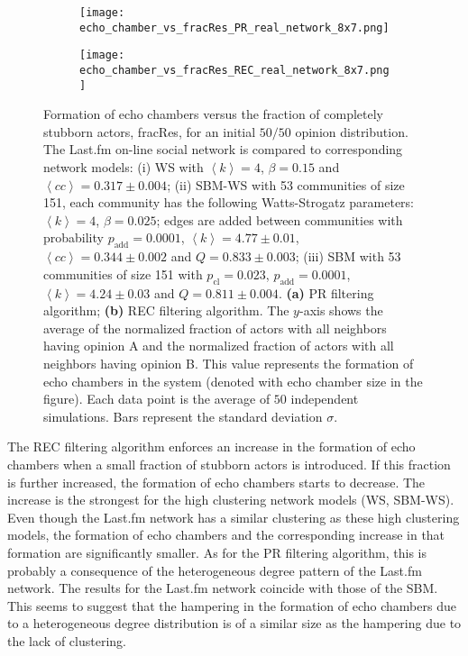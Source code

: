 \documentclass[11 pt , letterpaper , twoside , openright]{book}
\begin{document}
\begin{figure}[H]
  \begin{subfigure}[b]{0.49\textwidth}
    \caption{}
  	\texttt{[image: echo\_chamber\_vs\_fracRes\_PR\_real\_network\_8x7.png]}
    \label{pr_real}
  \end{subfigure}
  \begin{subfigure}[b]{0.49\textwidth}
    \caption{}
  	\texttt{[image: echo\_chamber\_vs\_fracRes\_REC\_real\_network\_8x7.png]}
    \label{rec_real}
  \end{subfigure}
  \captionsetup{format=plain}
  \caption[Formation of echo chambers versus fraction of completely stubborn actors for the PR and REC filtering algorithms and an initial $50/50$ opinion distribution. The Last.fm on-line social network is compared to corresponding network models.]{Formation of echo chambers versus the fraction of completely stubborn actors, fracRes, for an initial $50/50$ opinion distribution. The Last.fm on-line social network is compared to corresponding network models: (i) WS with $\left<k\right> = 4$, $\beta = 0.15$ and $\left<cc\right> = 0.317 \pm 0.004$; (ii) SBM-WS with 53 communities of size 151, each community has the following Watts-Strogatz parameters: $\left<k\right> = 4$, $\beta = 0.025$; edges are added between communities with probability $p_\text{add} = 0.0001$, $\left<k\right> = 4.77 \pm 0.01$, $\left<cc\right> = 0.344 \pm 0.002$ and $Q = 0.833 \pm 0.003$; (iii) SBM with 53 communities of size 151 with $p_\text{cl} = 0.023$, $p_\text{add} = 0.0001$, $\left<k\right> = 4.24 \pm 0.03$ and $Q = 0.811 \pm 0.004$. \textbf{(a)} PR filtering algorithm; \textbf{(b)} REC filtering algorithm. The $y$-axis shows the average of the normalized fraction of actors with all neighbors having opinion A and the normalized fraction of actors with all neighbors having opinion B. This value represents the formation of echo chambers in the system (denoted with echo chamber size in the figure). Each data point is the average of $50$ independent simulations. Bars represent the standard deviation $\sigma$.}
\label{echo_vs_fracRes_real}
\end{figure}
\noindent
The REC filtering algorithm enforces an increase in the formation of echo chambers when a small fraction of stubborn actors is introduced. If this fraction is further increased, the formation of echo chambers starts to decrease. The increase is the strongest for the high clustering network models (WS, SBM-WS). Even though the Last.fm network has a similar clustering as these high clustering models, the formation of echo chambers and the corresponding increase in that formation are significantly smaller. As for the PR filtering algorithm, this is probably a consequence of the heterogeneous degree pattern of the Last.fm network. The results for the Last.fm network coincide with those of the SBM. This seems to suggest that the hampering in the formation of echo chambers due to a heterogeneous degree distribution is of a similar size as the hampering due to the lack of clustering. 
\end{document}
